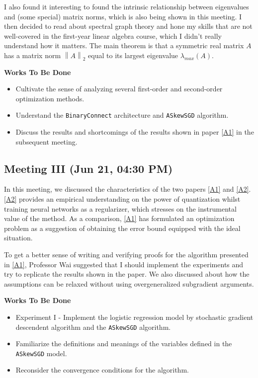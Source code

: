 \documentclass[10pt,a4paper]{article}
\begin{document}
I also found it interesting to found the intrinsic relationship between eigenvalues and (some special) matrix norms, which is also being shown in this meeting. I then decided to read about spectral graph theory and hone my skills that are not well-covered in the first-year linear algebra course, which I didn't really understand how it matters. The main theorem is that a symmetric real matrix $A$ has a matrix norm $\left\lVert A\right\rVert_2$ equal to its largest eigenvalue $\lambda_{max}(A)$.

\noindent\textbf{Works To Be Done}

\begin{itemize}
     \item Cultivate the sense of analyzing several first-order and second-order optimization methods.
     \item Understand the \texttt{BinaryConnect} architecture and \texttt{ASkewSGD} algorithm.
     \item Discuss the results and shortcomings of the results shown in paper \ref{A1} in the subsequent meeting.
\end{itemize}

\subsection{Meeting III (Jun 21, 04:30 PM)}

In this meeting, we discussed the characteristics of the two papers \ref{A1} and \ref{A2}. \ref{A2} provides an empirical understanding on the power of quantization whilst training neural networks as a regularizer, which stresses on the instrumental value of the method. As a comparison, \ref{A1} has formulated an optimization problem as a suggestion of obtaining the error bound equipped with the ideal situation.

To get a better sense of writing and verifying proofs for the algorithm presented in \ref{A1}, Professor Wai suggested that I should implement the experiments and try to replicate the results shown in the paper. We also discussed about how the assumptions can be relaxed without using overgeneralized subgradient arguments.

\noindent\textbf{Works To Be Done}

\begin{itemize}
     \item Experiment I - Implement the logistic regression model by stochastic gradient descendent algorithm and the \texttt{ASkewSGD} algorithm.
     \item Familiarize the definitions and meanings of the variables defined in the \texttt{ASkewSGD} model.
     \item Reconsider the convergence conditions for the algorithm.
\end{itemize}
\end{document}
